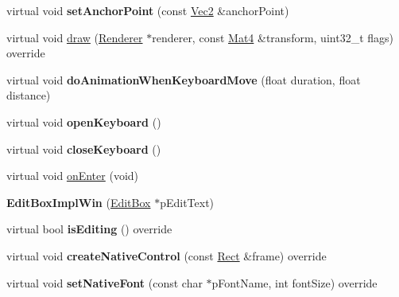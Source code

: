 \begin{DoxyCompactItemize}
\item 
\mbox{\label{classui_1_1EditBoxImplWin_a7e335eee35a7890ce29bd9d5fd1b7283}} 
virtual void {\bfseries set\+Anchor\+Point} (const \hyperlink{classVec2}{Vec2} \&anchor\+Point)
\item 
virtual void \hyperlink{classui_1_1EditBoxImplWin_a8709f6415ecea16cd9a09eb3fddc2d6a}{draw} (\hyperlink{classRenderer}{Renderer} $\ast$renderer, const \hyperlink{classMat4}{Mat4} \&transform, uint32\+\_\+t flags) override
\item 
\mbox{\label{classui_1_1EditBoxImplWin_a8ee7a84f15e11515925cfb32f0f33cb9}} 
virtual void {\bfseries do\+Animation\+When\+Keyboard\+Move} (float duration, float distance)
\item 
\mbox{\label{classui_1_1EditBoxImplWin_a0a81c46207b2f555fd70dfdf46da9491}} 
virtual void {\bfseries open\+Keyboard} ()
\item 
\mbox{\label{classui_1_1EditBoxImplWin_a2b08d6090937bb02a5477429525cc35a}} 
virtual void {\bfseries close\+Keyboard} ()
\item 
virtual void \hyperlink{classui_1_1EditBoxImplWin_a9cdc66776f0b0d70318866b0e4a3bfa7}{on\+Enter} (void)
\item 
\mbox{\label{classui_1_1EditBoxImplWin_aed994ecac4c5fc87fd736bc12b6f0e8d}} 
{\bfseries Edit\+Box\+Impl\+Win} (\hyperlink{classui_1_1EditBox}{Edit\+Box} $\ast$p\+Edit\+Text)
\item 
\mbox{\label{classui_1_1EditBoxImplWin_a60c8c61bd65104915ce47685b5256526}} 
virtual bool {\bfseries is\+Editing} () override
\item 
\mbox{\label{classui_1_1EditBoxImplWin_a51762d842352aa193833f7d5bb7e35e3}} 
virtual void {\bfseries create\+Native\+Control} (const \hyperlink{classRect}{Rect} \&frame) override
\item 
\mbox{\label{classui_1_1EditBoxImplWin_af0601597f26cb88e7155bd792207a636}} 
virtual void {\bfseries set\+Native\+Font} (const char $\ast$p\+Font\+Name, int font\+Size) override

\end{DoxyCompactItemize}
